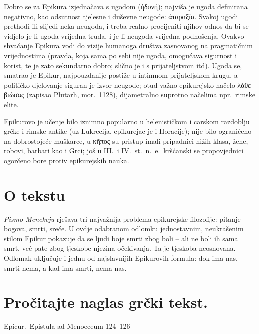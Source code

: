 Dobro se za Epikura izjednačava s ugodom \textgreek[variant=ancient]{(ἡδονή);} najviša je ugoda definirana negativno, kao odsutnost tjelesne i duševne neugode: ἀταραξία. Svakoj ugodi prethodi ili slijedi neka neugoda, i treba realno procijeniti njihov odnos da bi se vidjelo je li ugoda vrijedna truda, i je li neugoda vrijedna podnošenja. Ovakvo shvaćanje Epikura vodi do vizije humanoga društva zasnovanog na pragmatičnim vrijednostima (pravda, koja sama po sebi nije ugoda, omogućava sigurnost i korist, te je zato sekundarno dobro; slično je i s prijateljstvom itd). Ugoda se, smatrao je Epikur, najpouzdanije postiže u intimnom prijateljskom krugu, a političko djelovanje siguran je izvor neugode; otud važno epikurejsko načelo \textgreek[variant=ancient]{λάθε βιώσας} (zapisao Plutarh, mor.~1128), dijametralno suprotno načelima npr.\ rimske elite.

Epikurovo je učenje bilo iznimno popularno u helenističkom i carskom razdoblju grčke i rimske antike (uz Lukrecija, epikurejac je i Horacije); nije bilo ograničeno na dobrostojeće muškarce, u κῆπος su pristup imali pripadnici nižih klasa, žene, robovi, barbari kao i Grci; još u III.\ i IV.~st.\ n.~e.\ kršćanski se propovjednici ogorčeno bore protiv epikurejskih nauka.

\section*{O tekstu}

\textit{Pismo Menekeju} rješava tri najvažnija problema epikurejske filozofije: pitanje bogova, smrti, sreće. U ovdje odabranom odlomku jednostavnim, neukrašenim stilom Epikur pokazuje da se ljudi boje smrti zbog boli – ali ne boli ih sama smrt, već pate zbog tjeskobe njezina očekivanja. Ta je tjeskoba neosnovana. Odlomak uključuje i jednu od najslavnijih Epikurovih formula: dok ima nas, smrti nema, a kad ima smrti, nema nas.


\section*{Pročitajte naglas grčki tekst.}

Epicur.\ Epistula ad Menoeceum 124–126


\medskip


